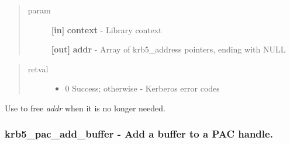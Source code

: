 \documentclass[letterpaper,10pt,english]{sphinxmanual}
\begin{document}
\begin{quote}\begin{description}
\item[{param}] \leavevmode
\textbf{{[}in{]}} \textbf{context} - Library context

\textbf{{[}out{]}} \textbf{addr} - Array of krb5\_address pointers, ending with NULL

\end{description}\end{quote}
\begin{quote}\begin{description}
\item[{retval}] \leavevmode\begin{itemize}
\item {} 
0   Success; otherwise - Kerberos error codes

\end{itemize}

\end{description}\end{quote}

Use {\hyperref[appdev/refs/api/krb5_free_addresses:krb5_free_addresses]{}} to free \emph{addr} when it is no longer needed.


\subsubsection{krb5\_pac\_add\_buffer -  Add a buffer to a PAC handle.}
\label{appdev/refs/api/krb5_pac_add_buffer:krb5-pac-add-buffer-add-a-buffer-to-a-pac-handle}\label{appdev/refs/api/krb5_pac_add_buffer::doc}

\begin{fulllineitems}
\label{appdev/refs/api/krb5_pac_add_buffer:krb5_pac_add_buffer}
\end{fulllineitems}
\end{document}
